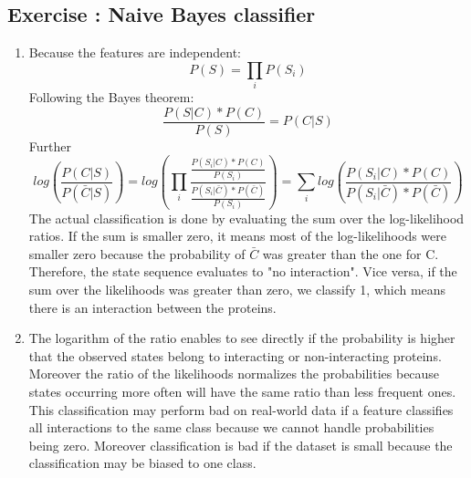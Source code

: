 \documentclass[10pt,a4paper]{article}
\newcommand{\exercise}[1]
{
  \stepcounter{subsection}
  \subsection*{Exercise \thesubsection: #1}

}
\begin{document}
\exercise{Naive Bayes classifier}
\begin{enumerate}
\item Because the features are independent: \begin{equation}P(S) = \prod_{i} P(S_i) \end{equation}
Following the Bayes theorem: \begin{equation} \frac{P(S|C) * P(C)} {P(S)} = P(C|S) \end{equation}
Further \begin{equation} log( \frac{P(C|S)} {P(\bar{C}|S)} ) = log( \prod_{i} \frac{ \frac{P(S_i|C) * P(C)}{P(S_i)} }{ \frac{P(S_i|\bar{C}) * P(\bar{C})}{P(S_i)} } ) = \sum_{i} log( \frac{P(S_i|C) * P(C)}{P(S_i|\bar{C}) * P(\bar{C})} ) \end{equation}
The actual classification is done by evaluating the sum over the log-likelihood ratios. If the sum is smaller zero, it means most of the log-likelihoods were smaller zero because the probability of $\bar{C}$ was greater than the one for C. Therefore, the state sequence evaluates to "no interaction". Vice versa, if the sum over the likelihoods was greater than zero, we classify 1, which means there is an interaction between the proteins.

\item The logarithm of the ratio enables to see directly if the probability is higher that the observed states belong to interacting or non-interacting proteins.
Moreover the ratio of the likelihoods normalizes the probabilities because states occurring more often will have the same ratio than less frequent ones.\\
This classification may perform bad on real-world data if a feature classifies all interactions to the same class because we cannot handle probabilities being zero. Moreover classification is bad if the dataset is small because the classification may be biased to one class.


\end{enumerate}
\end{document}
